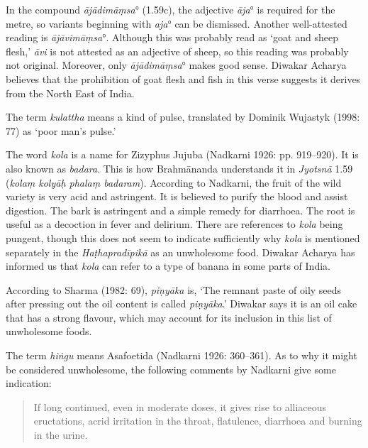 \begin{ekdosis}
\begin{philcomm}[hp01_059]
In the compound \emph{ājādimāṃsa}° (1.59c), the adjective \emph{āja}° is required for the metre,  so variants beginning with \emph{aja}° can be dismissed. Another well-attested reading is \emph{ājāvimāṃsa}°. Although this was probably read as `goat and sheep flesh,' \emph{āvi} is not attested as an adjective of sheep,
so this reading was probably not original. Moreover, only \emph{ājādimāṃsa}° makes good sense. Diwakar Acharya believes that the prohibition of goat flesh and fish in this verse suggests it derives from the North East of India.

The term \emph{kulattha} means a kind of pulse, translated by Dominik Wujastyk (1998: 77) as `poor man's pulse.'

The word \emph{kola} is a name for Zizyphus Jujuba (Nadkarni 1926: pp. 919--920). It is also known as \emph{badara}. This is how Brahmānanda understands it in \emph{Jyotsnā} 1.59 (\emph{kolaṃ kolyāḥ phalaṃ badaram}). According to Nadkarni, the fruit of the wild variety is very acid and astringent. It is believed to purify the blood and assist digestion. The bark is astringent and a simple remedy for diarrhoea. The root is useful as a decoction in fever and delirium. There are references to \emph{kola} being pungent, though this does not seem to indicate sufficiently why \emph{kola} is mentioned separately in the \emph{Haṭhapradīpikā} as an unwholesome food. Diwakar Acharya has informed us that \emph{kola} can refer to a type of banana in some parts of India.

According to Sharma (1982: 69), \emph{piṇyāka} is, ‘The remnant paste of oily seeds after pressing out the oil content is called \emph{piṇyāka}.’ Diwakar says it is an oil cake that has a strong flavour, which may account for its inclusion in this list of unwholesome foods.

The term \emph{hiṅgu} means Asafoetida (Nadkarni 1926: 360–361). As to why it might be considered unwholesome, the following comments by Nadkarni give some indication:
\begin{quote}
If long continued, even in moderate doses, it gives rise to alliaceous eructations, acrid irritation in the throat, flatulence, diarrhoea and burning in the urine.
\end{quote}

\end{philcomm}


\end{ekdosis}
